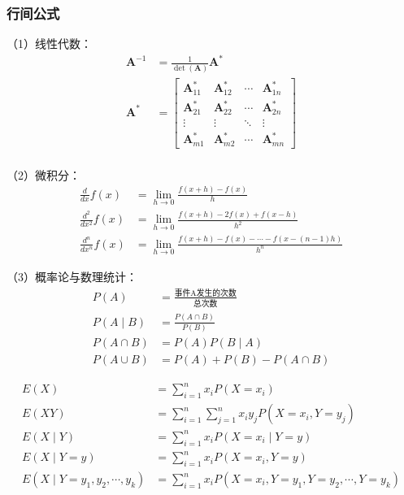 \documentclass[UTF8, zihao = -4, linespread = 1.335, heading = true, fontset = fandol]{ctexart}
\begin{document}
\subsubsection{行间公式}
（1）线性代数：
\begin{equation}
    \begin{split}
        \mathbf{A}^{-1} &= \frac{1}{\det(\mathbf{A})}\mathbf{A}^* \\
        \mathbf{A}^* &= \begin{bmatrix}
            \mathbf{A}_{11}^* & \mathbf{A}_{12}^* & \cdots & \mathbf{A}_{1n}^* \\
            \mathbf{A}_{21}^* & \mathbf{A}_{22}^* & \cdots & \mathbf{A}_{2n}^* \\
            \vdots & \vdots & \ddots & \vdots \\
            \mathbf{A}_{m1}^* & \mathbf{A}_{m2}^* & \cdots & \mathbf{A}_{mn}^*
        \end{bmatrix} \\
    \end{split}
\end{equation}

（2）微积分：
\begin{equation}
    \begin{split}
        \frac{d}{dx}f(x) &= \lim_{h \to 0}\frac{f(x+h)-f(x)}{h} \\
        \frac{d^2}{dx^2}f(x) &= \lim_{h \to 0}\frac{f(x+h)-2f(x)+f(x-h)}{h^2} \\
        \frac{d^n}{dx^n}f(x) &= \lim_{h \to 0}\frac{f(x+h)-f(x)-\cdots-f(x-(n-1)h)}{h^n}
    \end{split}
    \label{eq:1}
\end{equation}

（3）概率论与数理统计：
\begin{equation}
    \begin{split}
        P(A) &= \frac{\text{事件A发生的次数}}{\text{总次数}} \\
        P(A \mid B) &= \frac{P(A \cap B)}{P(B)} \\
        P(A \cap B) &= P(A)P(B \mid A) \\
        P(A \cup B) &= P(A) + P(B) - P(A \cap B)
    \end{split}
\end{equation}

\begin{equation}
    \begin{split}
        E(X) &= \sum_{i=1}^n x_iP(X=x_i) \\
        E(XY) &= \sum_{i=1}^n \sum_{j=1}^n x_iy_jP(X=x_i,Y=y_j) \\
        E(X \mid Y) &= \sum_{i=1}^n x_iP(X=x_i \mid Y=y) \\
        E(X \mid Y=y) &= \sum_{i=1}^n x_iP(X=x_i,Y=y) \\
        E(X \mid Y=y_1,y_2,\cdots,y_k) &= \sum_{i=1}^n x_iP(X=x_i,Y=y_1,Y=y_2,\cdots,Y=y_k)
    \end{split}
\end{equation}
\end{document}
